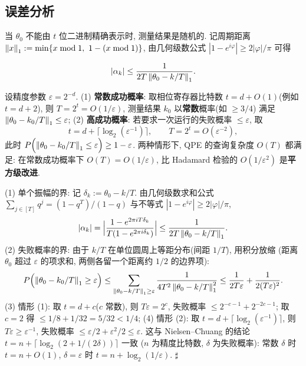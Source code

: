 \documentclass[utf8]{article} %
\numberwithin{equation}{section}   %
\newtheorem{Thm}{\hskip 2em {\color{blue} 定理}}[subsection]
\newenvironment{Proof}[1][\relax]{{\noindent\it Proof\ifx\relax#1\relax\else\ (#1)\fi:}\quad}{\hfill $\sharp$\par}
\begin{document}
\subsection{误差分析}

当 $\theta_0$ 不能由 $t$ 位二进制精确表示时, 测量结果是随机的.
记周期距离 $\norm{x}_1 := \min\{x \bmod 1,\ 1 - (x \bmod 1)\}$, 由几何级数公式
$|1 - e^{i\varphi}| \ge 2|\varphi|/\pi$ 可得

\begin{equation}
    |\alpha_k| \le \frac{1}{2T\, \norm{\theta_0 - k/T}_1}.
\end{equation}

\begin{Thm}
    设精度参数 $\varepsilon = 2^{-d}$.
    (1) \textbf{常数成功概率}: 取相位寄存器比特数 $t = d + O(1)$(例如 $t = d + 2$),
    则 $T = 2^t = O(1/\varepsilon)$, 测量结果 $k_0$ 以\textbf{常数}概率(如 $\ge 3/4$)
    满足 $\norm{\theta_0 - k_0/T}_1 \le \varepsilon$;
    (2) \textbf{高成功概率}: 若要求一次运行的失败概率 $\le \varepsilon$, 取
    \begin{equation}
        t = d + \lceil \log_2(\varepsilon^{-1}) \rceil, \qquad
        T = 2^t = O(\varepsilon^{-2}),
    \end{equation}
    此时 $P\Big(\norm{\theta_0 - k_0/T}_1 \le \varepsilon\Big) \ge 1 - \varepsilon$.
    两种情形下, QPE 的查询复杂度 $O(T)$ 都满足: 在常数成功概率下
    $O(T) = O(1/\varepsilon)$, 比 Hadamard 检验的 $O(1/\varepsilon^2)$ 是\textbf{平方级改进}.
\end{Thm}

\begin{Proof}
    (1) 单个振幅的界: 记 $\delta_k := \theta_0 - k/T$. 由几何级数求和公式
    $\sum_{j\in[T]} q^j = (1-q^T)/(1-q)$ 与不等式 $|1 - e^{i\varphi}| \ge 2|\varphi|/\pi$,
    \begin{equation}
        |\alpha_k| = \Big|\frac{1 - e^{2\pi i T\delta_k}}{T(1 - e^{2\pi i \delta_k})}\Big|
        \le \frac{1}{2T\, \norm{\theta_0 - k/T}_1}.
    \end{equation}
    (2) 失败概率的界: 由于 $k/T$ 在单位圆周上等距分布(间距 $1/T$), 用积分放缩
    (距离 $\theta_0$ 超过 $\varepsilon$ 的项求和, 两侧各留一个距离约 $1/2$ 的边界项):
    \begin{equation}
        P\Big(\norm{\theta_0 - k_0/T}_1 \ge \varepsilon\Big)
        \le \sum_{\norm{\theta_0 - k/T}_1 \ge \varepsilon}
        \frac{1}{4T^2\, \norm{\theta_0 - k/T}_1^2}
        \le \frac{1}{2T\varepsilon} + \frac{1}{2(T\varepsilon)^2}.
    \end{equation}
    (3) 情形 (1): 取 $t = d + c$($c$ 常数), 则 $T\varepsilon = 2^c$, 失败概率
    $\le 2^{-c-1} + 2^{-2c-1}$; 取 $c = 2$ 得 $\le 1/8 + 1/32 = 5/32 < 1/4$;
    (4) 情形 (2): 取 $t = d + \lceil\log_2(\varepsilon^{-1})\rceil$, 则
    $T\varepsilon \ge \varepsilon^{-1}$, 失败概率 $\le \varepsilon/2 + \varepsilon^2/2 \le \varepsilon$.
    这与 Nielsen--Chuang 的结论 $t = n + \lceil\log_2(2 + 1/(2\delta))\rceil$ 一致
    ($n$ 为精度比特数, $\delta$ 为失败概率): 常数 $\delta$ 时 $t = n + O(1)$,
    $\delta = \varepsilon$ 时 $t = n + \log_2(1/\varepsilon)$.
\end{Proof}
\end{document}
